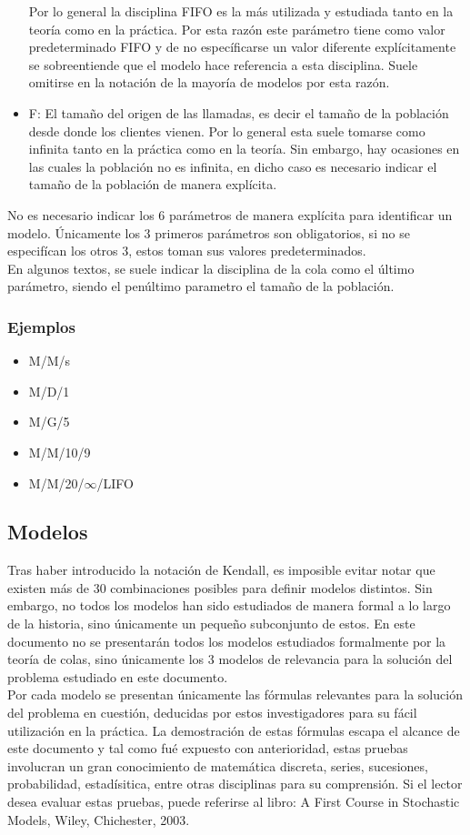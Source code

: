 \documentclass{article}
\begin{document}
\begin{itemize}
\begin{itemize}
		\end{itemize}
		Por lo general la disciplina FIFO es la más utilizada y estudiada
		tanto en la teoría como en la práctica. Por esta razón 
		este parámetro tiene como valor predeterminado FIFO y de no 
		específicarse un valor diferente explícitamente se sobreentiende 
		que el modelo hace referencia a esta disciplina. Suele omitirse 
		en la notación de la mayoría de modelos por esta razón.
	\item \large{F: }
		El tamaño del origen de las llamadas, es decir el tamaño
		de la población desde donde los clientes vienen. Por lo general 
		esta suele tomarse como infinita tanto en la práctica como 
		en la teoría. Sin embargo, hay ocasiones en las cuales la población 
		no es infinita, en dicho caso es necesario indicar el tamaño de la
		población de manera explícita.
\end{itemize}
No es necesario indicar los 6 parámetros de manera explícita para identificar un modelo.
Únicamente los 3 primeros parámetros son obligatorios, si no se especifícan los 
otros 3, estos toman sus valores predeterminados.\\
En algunos textos, se suele indicar la disciplina de la cola
como el último parámetro, siendo el penúltimo parametro el tamaño de la población.
\subsubsection{Ejemplos}
\begin{itemize}
	\item M/M/s
	\item M/D/1
	\item M/G/5
	\item M/M/10/9
	\item M/M/20/$\infty$/LIFO
\end{itemize}
\subsection{Modelos}
Tras haber introducido la notación de Kendall, es imposible evitar notar
que existen más de 30 combinaciones posibles para definir modelos distintos.
Sin embargo, no todos los modelos han sido estudiados de manera formal
a lo largo de la historia, sino únicamente un pequeño subconjunto de estos.
En este documento no se presentarán todos los modelos estudiados formalmente por 
la teoría de colas, sino únicamente los 3 modelos de relevancia para la solución 
del problema estudiado en este documento. \\
Por cada modelo se presentan únicamente las fórmulas relevantes
para la solución del problema en cuestión,
deducidas por estos investigadores para su fácil utilización
en la práctica. La demostración de estas fórmulas escapa el alcance de este documento
y tal como fué expuesto con anterioridad, estas pruebas 
involucran un gran conocimiento de matemática discreta, series, sucesiones, 
probabilidad, estadísitica, entre otras disciplinas para su comprensión. Si 
el lector desea evaluar estas pruebas, puede referirse al libro:
A First Course in Stochastic Models, Wiley, Chichester, 2003.
\end{document}
